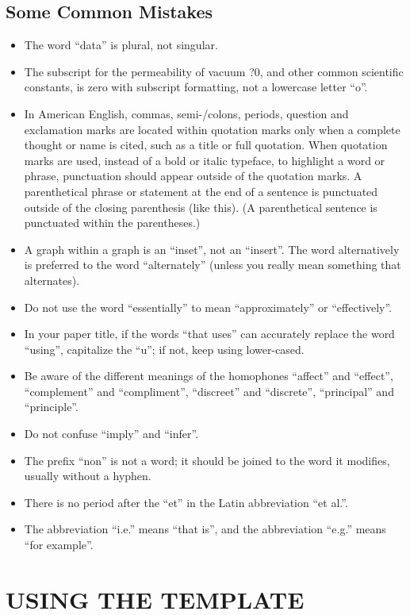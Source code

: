 \documentclass[letterpaper, 10 pt, conference]{ieeeconf}  %
\begin{document}
\subsection{Some Common Mistakes}
\begin{itemize}


\item The word ``data'' is plural, not singular.
\item The subscript for the permeability of vacuum ?0, and other common scientific constants, is zero with subscript formatting, not a lowercase letter ``o''.
\item In American English, commas, semi-/colons, periods, question and exclamation marks are located within quotation marks only when a complete thought or name is cited, such as a title or full quotation. When quotation marks are used, instead of a bold or italic typeface, to highlight a word or phrase, punctuation should appear outside of the quotation marks. A parenthetical phrase or statement at the end of a sentence is punctuated outside of the closing parenthesis (like this). (A parenthetical sentence is punctuated within the parentheses.)
\item A graph within a graph is an ``inset'', not an ``insert''. The word alternatively is preferred to the word ``alternately'' (unless you really mean something that alternates).
\item Do not use the word ``essentially'' to mean ``approximately'' or ``effectively''.
\item In your paper title, if the words ``that uses'' can accurately replace the word ``using'', capitalize the ``u''; if not, keep using lower-cased.
\item Be aware of the different meanings of the homophones ``affect'' and ``effect'', ``complement'' and ``compliment'', ``discreet'' and ``discrete'', ``principal'' and ``principle''.
\item Do not confuse ``imply'' and ``infer''.
\item The prefix ``non'' is not a word; it should be joined to the word it modifies, usually without a hyphen.
\item There is no period after the ``et'' in the Latin abbreviation ``et al.''.
\item The abbreviation ``i.e.'' means ``that is'', and the abbreviation ``e.g.'' means ``for example''.

\end{itemize}


\section{USING THE TEMPLATE}
\end{document}
